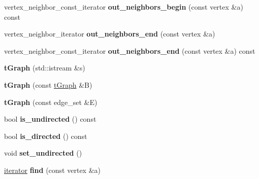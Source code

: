 \begin{DoxyCompactItemize}
\mbox{\label{class_n_graph_1_1t_graph_a58a0b9135d7fdc9bd9bccb37f477ea12}} 
vertex\+\_\+neighbor\+\_\+const\+\_\+iterator {\bfseries out\+\_\+neighbors\+\_\+begin} (const vertex \&a) const
\item 
\mbox{\label{class_n_graph_1_1t_graph_a85890eeb0085d0079824acc5a8c0240b}} 
vertex\+\_\+neighbor\+\_\+iterator {\bfseries out\+\_\+neighbors\+\_\+end} (const vertex \&a)
\item 
\mbox{\label{class_n_graph_1_1t_graph_a90ed49e6b1a6b555713370d8cc3a11c9}} 
vertex\+\_\+neighbor\+\_\+const\+\_\+iterator {\bfseries out\+\_\+neighbors\+\_\+end} (const vertex \&a) const
\item 
\mbox{\label{class_n_graph_1_1t_graph_a548e93259bcece749bed2d6375049be9}} 
{\bfseries t\+Graph} (std\+::istream \&s)
\item 
\mbox{\label{class_n_graph_1_1t_graph_a70928f9e49923184ee26a228ebd23ff5}} 
{\bfseries t\+Graph} (const \mbox{\hyperlink{class_n_graph_1_1t_graph}{t\+Graph}} \&B)
\item 
\mbox{\label{class_n_graph_1_1t_graph_a8267a8db43eae2dd34d1d50db57e821c}} 
{\bfseries t\+Graph} (const edge\+\_\+set \&E)
\item 
\mbox{\label{class_n_graph_1_1t_graph_a512ce90c67d43855c0f6b131a90dfbce}} 
bool {\bfseries is\+\_\+undirected} () const
\item 
\mbox{\label{class_n_graph_1_1t_graph_a0533e8f86aceaa221f64d835178fd966}} 
bool {\bfseries is\+\_\+directed} () const
\item 
\mbox{\label{class_n_graph_1_1t_graph_a374bc267c08ca80f7bece5f2230848d0}} 
void {\bfseries set\+\_\+undirected} ()
\item 
\mbox{\label{class_n_graph_1_1t_graph_a94305809ed5bd6531d73e74d5b63055f}} 
\mbox{\hyperlink{class_n_graph_1_1t_graph_a6e446a33b74e5c0c39fb6c50a4f07cec}{iterator}} {\bfseries find} (const vertex \&a)

\end{DoxyCompactItemize}
